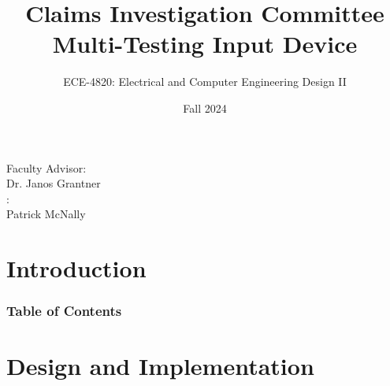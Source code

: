 \documentclass[8pt,compress]{beamer}
\title{Claims Investigation Committee Multi-Testing Input Device}
\subtitle{ECE-4820: Electrical and Computer Engineering Design II}
\author[Garza, Baker, Sah]{Dylan-Matthew Garza \and Daniel Baker \and Rohullah Sah \and}
\institute[VFU] %
{
      Department of Electrical and Computer Engineering\\
      Western Michigan University
      \and
      ZF Group\\
      Auburn Hills, MI
}
\date{Fall 2024}
\begin{document}
\begin{frame}[plain]
  \titlepage
  \small
  \begin{multicols}{2}
      Faculty Advisor:\\
      Dr. Janos Grantner\hfill\\
    \hfill{}:\\
    \hfill Patrick McNally
  \end{multicols}
\end{frame}

\section{Introduction}
\begin{frame}
  \frametitle{Table of Contents}
  \tableofcontents
\end{frame}

\section{Design and Implementation}

\end{document}
